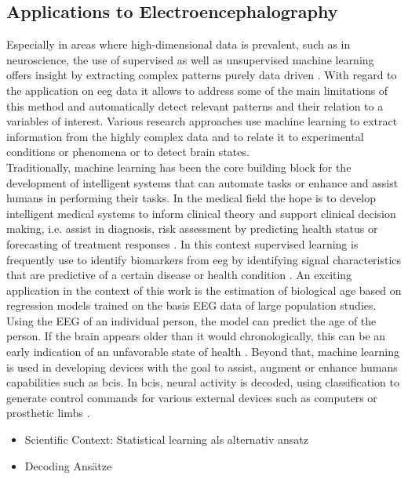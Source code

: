 \subsection{Applications to Electroencephalography}
Especially in areas where high-dimensional data is prevalent, such as in neuroscience, the use of supervised as well as unsupervised machine learning offers insight by extracting complex patterns purely data driven \cite{Bzdok2017}. With regard to the application on \gls{eeg} data it allows to address some of the main limitations of this method and automatically detect relevant patterns and their relation to a variables of interest. Various research approaches use machine learning to extract information from the highly complex data and to relate it to experimental conditions or phenomena or to detect brain states.\\
Traditionally, machine learning has been the core building block for the development of intelligent systems that can automate tasks or enhance and assist humans in performing their tasks. In the medical field the hope is to develop intelligent medical systems to inform clinical theory and support clinical decision making, i.e. assist in diagnosis, risk assessment by predicting health status or forecasting of treatment responses \cite{Woo2017}. In this context supervised learning is frequently use to identify biomarkers from \gls{eeg} by identifying signal characteristics that are predictive of a certain disease or health condition \cite{Babiloni_AlzCons2021,Mei2021}. An exciting application in the context of this work is the estimation of biological age based on regression models trained on the basis \gls{EEG} data of large population studies. Using the EEG of an individual person, the model can predict the age of the person. If the brain appears older than it would chronologically, this can be an early indication of an unfavorable state of health \cite{Engemann2022}. Beyond that, machine learning is used in developing devices with the goal to assist, augment or enhance humans capabilities such as \glspl{bci}.  In \glspl{bci}, neural activity is decoded, using classification to generate control commands for various external devices such as computers or prosthetic limbs \cite{Saha2021, Anumanchipalli2019}.
\begin{itemize}
next BCI 
\item{Scientific Context: Statistical learning als alternativ ansatz}
\item{Decoding Ansätze} 
\end{itemize}






